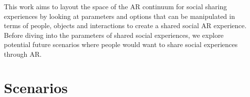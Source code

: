 

This work aims to layout the space of the AR continuum for social sharing experiences by looking at parameters and options that can be manipulated in terms of people, objects and interactions to create a shared social AR experience. Before diving into the parameters of shared social experiences, we explore potential future scenarios where people would want to share social experiences through AR.

\section{Scenarios}



